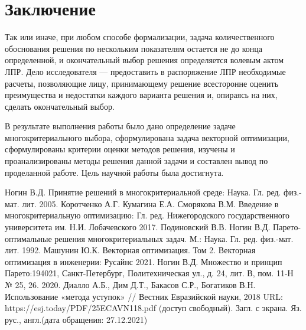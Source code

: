\documentclass[a4paper,14pt]{report}
\begin{document}
\chapter{Заключение}
Так или иначе, при любом способе формализации, задача количественного обоснования решения по нескольким показателям остается не до конца определенной, и окончательный выбор решения определяется волевым актом ЛПР. Дело исследователя --- предоставить в распоряжение ЛПР необходимые расчеты, позволяющие лицу, принимающему решение всесторонне оценить преимущества и недостатки каждого варианта решения и, опираясь на них, сделать окончательный выбор.

В результате выполнения работы было дано определение задаче многокритериального выбора, сформулирована задача векторной оптимизации, сформулированы критерии оценки методов решения, изучены и проанализированы методы решения данной задачи и составлен вывод по проделанной работе. Цель научной работы была достигнута.

\renewcommand\bibname{Список литературы}
\makeatletter %
\def\@biblabel#1{#1. }
\makeatother
\begin{thebibliography}{2}
	 Ногин В.Д. Принятие решений в многокритериальной среде: Наука. Гл. ред. физ.-мат. лит. 2005.
     Коротченко А.Г. Кумагина Е.А. Сморякова В.М. Введение в многокритериальную оптимизацию: Гл. ред. Нижегородского государственного университета
им. Н.И. Лобачевского 2017.
	\bibitem{} Подиновский В.В. Ногин В.Д. Парето-оптимальные решения многокритериальных задач. М.: Наука. Гл. ред. физ.-мат. лит. 1992.
	 Машунин Ю.К. Векторная оптимизация. Том 2. Векторная оптимизация в инженерии: Русайнс 2021.
	 Ногин В.Д. Множество и принцип Парето:194021, Санкт-Петербург, Политехническая ул., д. 24, лит. В, пом. 11-Н № 25, 26. 2020.
	\bibitem{} Диалло А.Б., Дим Д.Т., Бакасов С.Р., Богатиков В.Н. Использование «метода уступок»  // Вестник Евразийской науки, 2018 URL:
https://esj.today/PDF/25ECAVN118.pdf (доступ свободный). Загл. с экрана. Яз. рус., англ.(дата обращения: 27.12.2021)
\end{thebibliography}
\end{document}
